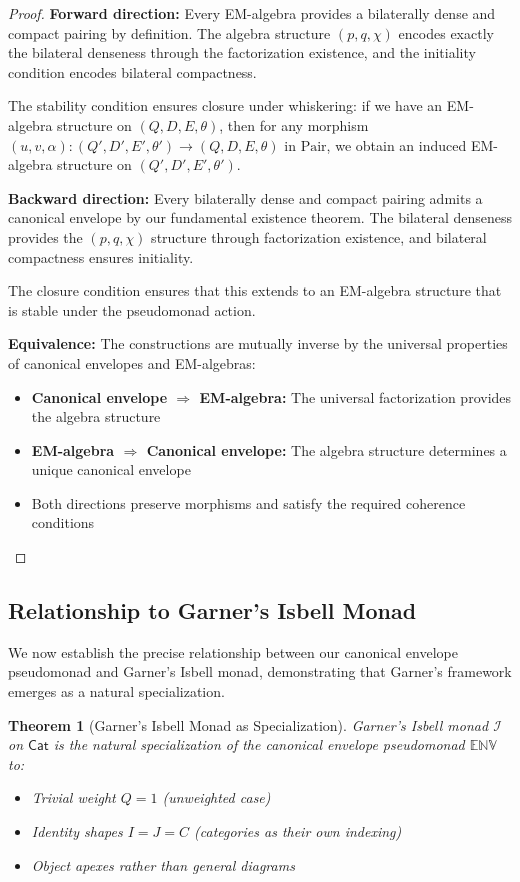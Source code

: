 \documentclass[11pt]{article}
\theoremstyle{plain}
\newtheorem{theorem}{Theorem}[section]
\theoremstyle{definition}
\theoremstyle{remark}
\newcommand{\cat}[1]{\mathsf{#1}}
\newcommand{\Pair}{\mathrm{Pair}}
\begin{document}
\begin{proof}
\textbf{Forward direction:} Every EM-algebra provides a bilaterally dense and compact pairing by definition. The algebra structure $(p, q, \chi)$ encodes exactly the bilateral denseness through the factorization existence, and the initiality condition encodes bilateral compactness.

The stability condition ensures closure under whiskering: if we have an EM-algebra structure on $(Q, D, E, \theta)$, then for any morphism $(u, v, \alpha) : (Q', D', E', \theta') \to (Q, D, E, \theta)$ in $\Pair$, we obtain an induced EM-algebra structure on $(Q', D', E', \theta')$.

\textbf{Backward direction:} Every bilaterally dense and compact pairing admits a canonical envelope by our fundamental existence theorem. The bilateral denseness provides the $(p, q, \chi)$ structure through factorization existence, and bilateral compactness ensures initiality.

The closure condition ensures that this extends to an EM-algebra structure that is stable under the pseudomonad action.

\textbf{Equivalence:} The constructions are mutually inverse by the universal properties of canonical envelopes and EM-algebras:
\begin{itemize}
\item \textbf{Canonical envelope $\Rightarrow$ EM-algebra:} The universal factorization provides the algebra structure
\item \textbf{EM-algebra $\Rightarrow$ Canonical envelope:} The algebra structure determines a unique canonical envelope
\item Both directions preserve morphisms and satisfy the required coherence conditions
\end{itemize}
\end{proof}

\subsection{Relationship to Garner's Isbell Monad}

We now establish the precise relationship between our canonical envelope pseudomonad and Garner's Isbell monad, demonstrating that Garner's framework emerges as a natural specialization.

\begin{theorem}[Garner's Isbell Monad as Specialization]
Garner's Isbell monad $\mathcal{I}$ on $\cat{Cat}$ is the natural specialization of the canonical envelope pseudomonad $\mathbb{ENV}$ to:
\begin{itemize}
\item Trivial weight $Q = 1$ (unweighted case)
\item Identity shapes $I = J = C$ (categories as their own indexing)
\item Object apexes rather than general diagrams
\end{itemize}
\end{theorem}
\end{document}
